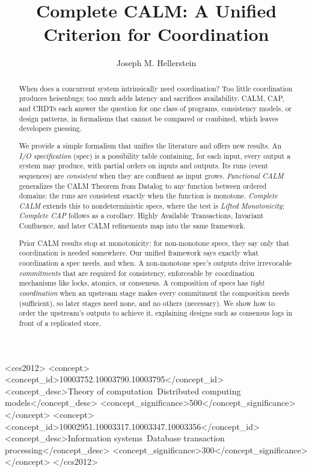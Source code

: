 \documentclass[sigconf]{cidr-2027}
\theoremstyle{remark}
\newcommand{\commitment}{commitment\xspace}
\newcommand{\commitments}{commitments\xspace}
\newcommand{\spectype}[1][]{I/O specification#1\xspace}
\newif\ifshowrv \showrvfalse
\newcommand{\rv}[1]{\ifshowrv\textsuperscript{\textcolor{magenta}{\textbf{R#1}}}\fi}
\begin{document}
\title{Complete CALM: A Unified Criterion for Coordination}

\author{Joseph M. Hellerstein}

\begin{abstract}
When does a concurrent system intrinsically need coordination?  Too little
coordination produces heisenbugs; too much adds latency and sacrifices
availability.  CALM, CAP, and CRDTs each answer the question for one class of
programs, consistency models, or design patterns, in formalisms that cannot be
compared or combined, which leaves developers guessing.

We provide a simple formalism that unifies the literature and
offers new results.  An \emph{\spectype} (spec) is a possibility table containing, for
each input, every output a system may produce, with partial orders on inputs and
outputs.  Its runs (event sequences)\rv{7} are \emph{consistent} when they are confluent as input grows.
\emph{Functional CALM} generalizes the CALM Theorem from Datalog to any function
between ordered domains: the runs are consistent exactly when the function is
monotone.  \emph{Complete CALM}
extends this to nondeterministic specs, where the test is
\emph{Lifted Monotonicity}; \emph{Complete CAP} follows as a corollary.
Highly Available Transactions, Invariant Confluence, and later CALM refinements map into the same framework.

Prior CALM results stop at monotonicity: for non-monotone
specs, they say only that coordination is needed somewhere.  Our
unified framework says exactly
what coordination a spec needs, and when.  A non-monotone
spec's outputs drive irrevocable \emph{\commitments} that are required for consistency,
enforceable by coordination mechanisms like locks, atomics, or consensus.
A composition of specs has \emph{tight coordination} when an upstream stage makes every \commitment the composition needs (sufficient), so later stages need none, and no others (necessary).\rv{8}  We show how to order the upstream's outputs to achieve it, explaining designs such
as consensus logs in front of a replicated store.
\end{abstract}

\begin{CCSXML}
<ccs2012>
<concept>
<concept_id>10003752.10003790.10003795</concept_id>
<concept_desc>Theory of computation~Distributed computing models</concept_desc>
<concept_significance>500</concept_significance>
</concept>
<concept>
<concept_id>10002951.10003317.10003347.10003356</concept_id>
<concept_desc>Information systems~Database transaction processing</concept_desc>
<concept_significance>300</concept_significance>
</concept>
</ccs2012>
\end{CCSXML}
\end{document}
